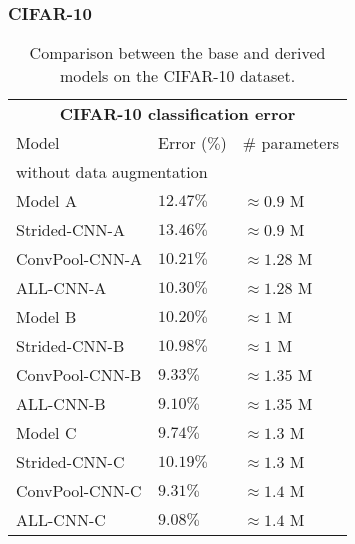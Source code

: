 \documentclass{article} \usepackage{iclr2015,times}
\begin{document}
\subsubsection{CIFAR-10}
\begin{table}[h]
\caption{Comparison between the base and derived models on the CIFAR-10 dataset.}
\label{results-cifar10-base}
\begin{center}
\begin{tabular}{lll}
\multicolumn{3}{c}{\bf CIFAR-10 classification error} \\
\multicolumn{1}{l}{Model} & \multicolumn{1}{l}{Error ($\%$)} & \multicolumn{1}{l}{\# parameters} \\
\hline
\multicolumn{3}{l}{without data augmentation} \\
\hline
Model A         &  $12.47 \%$ & $\approx 0.9$ M \\
Strided-CNN-A         &  $13.46 \%$ & $\approx 0.9$ M \\
ConvPool-CNN-A         &  $\mathbf{10.21} \%$ & $\approx 1.28$ M \\
ALL-CNN-A         &  $10.30 \%$ & $\approx 1.28$ M \\
\hline
Model B         &  $10.20 \%$ & $\approx 1$ M \\
Strided-CNN-B         &  $10.98 \%$ & $\approx 1$ M \\
ConvPool-CNN-B         &  $9.33 \%$ & $\approx 1.35$ M \\
ALL-CNN-B         &  $\mathbf{9.10} \%$ & $\approx 1.35$ M \\
\hline
Model C         &  $9.74 \%$ & $\approx 1.3$ M \\
Strided-CNN-C         &  $10.19 \%$ & $\approx 1.3$ M \\
ConvPool-CNN-C         &  $9.31 \%$ & $\approx 1.4$ M \\
ALL-CNN-C         &  $\mathbf{9.08 \%}$ & $\approx 1.4$ M \\
\end{tabular}
\end{center}
\end{table}
\end{document}
